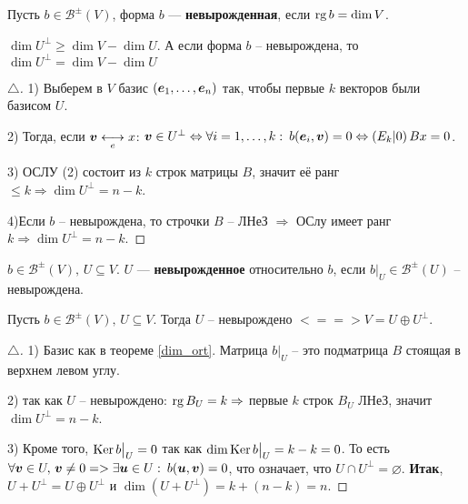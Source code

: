 \begin{to_def} 
	Пусть  $b \in \mathcal{B}^\pm (V)$, форма $b$ --- \textbf{невырожденная},
	 если $\mathop{\mathrm{rg}}\nolimits b = \dim V$.
\end{to_def}

\begin{to_thr} 
	$\dim U^\bot \geq \dim V - \dim U$. А если форма $b$ -- невырождена, то $\dim U^\bot = \dim V - \dim U$
	\label{dim_ort}
\end{to_thr}

\begin{proof}[$\triangle$]
	1) Выберем в $V$ базис $(\mbox{\boldmath $e$}_1,\ldots,\mbox{\boldmath $e$}_n)$ так, чтобы первые $k$ векторов были базисом $U$.

	2) Тогда, если $\mbox{\boldmath $v$} \underset{e}{\longleftrightarrow} x$: $\mbox{\boldmath $v$} \in U^\bot \Leftrightarrow \forall i = 1,\ldots,k: \: b(\mbox{\boldmath $e$}_i, \mbox{\boldmath $v$}) = 0 \Leftrightarrow \left(E_k | 0\right) B x = 0$.

	3) ОСЛУ (2) состоит из $k$ строк матрицы $B$, значит её ранг $\leq k \Longrightarrow \dim U^\bot = n -k$.

	4)Если $b$ -- невырождена, то строчки $B$ -- ЛНеЗ $\Longrightarrow$ ОСлу имеет ранг $k \Longrightarrow \dim U^\bot = n -k$.
\end{proof}

\begin{to_def} 
	$b \in \mathcal{B}^\pm (V), \, U \subseteq V$. $U$ --- \textbf{невырожденное} относительно $b$, если $b \big|_U \in \mathcal{B}^\pm (U)$ -- невырождена. 
\end{to_def}

\begin{to_thr} 
	 Пусть $b \in \mathcal{B}^\pm (V), \, U \subseteq V$. Тогда $U$ -- невырождено $<==> V = U \oplus U^\bot$.
\end{to_thr}

\begin{proof}[$\triangle$]
	1) Базис как в теореме \eqref{dim_ort}. Матрица $b \big|_U$ -- это подматрица $B$ стоящая в верхнем левом углу.

	2) так как $U$ -- невырождено: $\mathop{\mathrm{rg}}\nolimits B_U = k \Rightarrow$ первые $k$ строк $B_U$ ЛНеЗ, значит $\dim U^\bot = n -k$.

	3) Кроме того, $\mathop{\mathrm{Ker}}\nolimits b \big|_U = 0$ так как $\dim \mathop{\mathrm{Ker}}\nolimits b \big|_U = k - k = 0$. То есть $\forall \mbox{\boldmath $v$} \in U, \, \mbox{\boldmath $v$} \neq 0 => \exists \mbox{\boldmath $u$} \in U: \: b(\mbox{\boldmath $u$},\mbox{\boldmath $v$}) = 0$, что означает, что $U \cap U^\bot = \varnothing$. \textbf{Итак}, $U + U^\bot = U \oplus U^\bot$ и $\dim(U + U^\bot) = k + (n-k) = n$.
\end{proof}